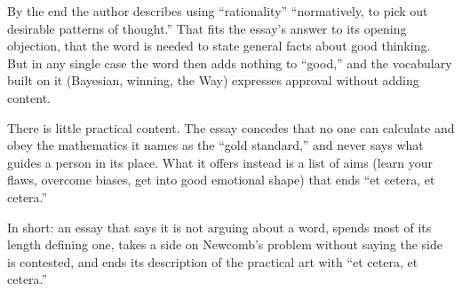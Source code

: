 \begin{afterword}
By the end the author describes using ``rationality'' ``normatively, to pick out desirable patterns of thought.'' That fits the essay's answer to its opening objection, that the word is needed to state general facts about good thinking. But in any single case the word then adds nothing to ``good,'' and the vocabulary built on it (Bayesian, winning, the Way) expresses approval without adding content.

There is little practical content. The essay concedes that no one can calculate and obey the mathematics it names as the ``gold standard,'' and never says what guides a person in its place. What it offers instead is a list of aims (learn your flaws, overcome biases, get into good emotional shape) that ends ``et cetera, et cetera.''

In short: an essay that says it is not arguing about a word, spends most of its length defining one, takes a side on Newcomb's problem without saying the side is contested, and ends its description of the practical art with ``et cetera, et cetera.''
\end{afterword}
